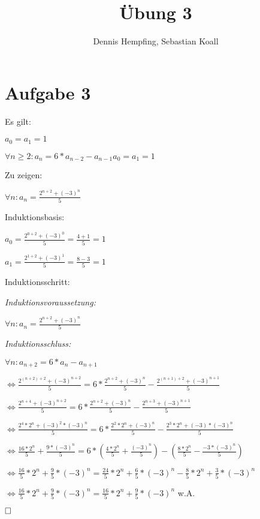 \documentclass[12pt]{scrartcl}%
\theoremstyle{nonumberplain}
\begin{document}
\author{Dennis Hempfing, Sebastian Koall}
\title{Übung 3}
\date{} 
\pagestyle{myheadings}

\maketitle %
 
\section*{Aufgabe 3}
{\large Es gilt:}

$ a_0 = a_1 = 1 $

$ \forall n \ge 2: a_n = 6 * a_{n-2} - a_{n-1} $$ a_0 = a_1 = 1 $

{\large Zu zeigen:}

$  \forall n : a_{n} = \frac{2^{n + 2} + (-3)^n}{5} $

{\large Induktionsbasis:}

$ a_0 = \frac{2^{0 + 2} + (-3)^0}{5} = \frac{4 + 1}{5} = 1 $

$ a_1 = \frac{2^{1 + 2} + (-3)^1}{5} = \frac{8 - 3}{5} = 1 $

{\large Induktionsschritt:}

\emph{Induktionsvoraussetzung:}

$  \forall n : a_{n} = \frac{2^{n + 2} + (-3)^n}{5} $

\emph{Induktionsschluss:}

$ \forall n : a_{n+2} = 6 * a_{n} - a_{n+1} $ 

$ \Leftrightarrow \frac{2^{(n + 2) + 2} + (-3)^{n+2}}{5} = 6 * \frac{2^{n + 2} + (-3)^n}{5} - \frac{2^{(n + 1) + 2} + (-3)^{n+1}}{5} $

$ \Leftrightarrow \frac{2^{n + 4} + (-3)^{n+2}}{5} = 6 * \frac{2^{n + 2} + (-3)^n}{5} - \frac{2^{n + 3} + (-3)^{n+1}}{5} $

$ \Leftrightarrow \frac{2^4 * 2^n + (-3)^2 * (-3)^n}{5} = 6 * \frac{2^2 * 2^n + (-3)^n}{5} - \frac{2^3 * 2^n + (-3) * (-3)^n}{5} $

$ \Leftrightarrow \frac{16 * 2^n}{5} + \frac{9 * (-3)^n}{5} = 6 * \left( \frac{4 * 2^n}{5} + \frac{(-3)^n}{5} \right) - \left( \frac{8 * 2^n}{5} - \frac{-3 * (-3)^n}{5} \right) $

$ \Leftrightarrow \frac{16}{5} * 2^n + \frac{9}{5} * (-3)^n = \frac{24}{5} * 2^n + \frac{6}{5} * (-3)^n - \frac{8}{5} * 2^n + \frac{3}{5} * (-3)^n $

$ \Leftrightarrow \frac{16}{5} * 2^n + \frac{9}{5} * (-3)^n = \frac{16}{5} * 2^n + \frac{9}{5} * (-3)^n $ \hfill w.A.

$ \hfill \square $
\end{document}
